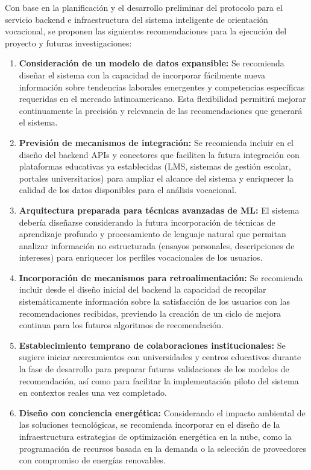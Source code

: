 Con base en la planificación y el desarrollo preliminar del protocolo para el servicio backend e infraestructura del sistema inteligente de orientación vocacional, se proponen las siguientes recomendaciones para la ejecución del proyecto y futuras investigaciones:
\begin{enumerate}
\item \textbf{Consideración de un modelo de datos expansible:} Se recomienda diseñar el sistema con la capacidad de incorporar fácilmente nueva información sobre tendencias laborales emergentes y competencias específicas requeridas en el mercado latinoamericano. Esta flexibilidad permitirá mejorar continuamente la precisión y relevancia de las recomendaciones que generará el sistema.
\item \textbf{Previsión de mecanismos de integración:} Se recomienda incluir en el diseño del backend APIs y conectores que faciliten la futura integración con plataformas educativas ya establecidas (LMS, sistemas de gestión escolar, portales universitarios) para ampliar el alcance del sistema y enriquecer la calidad de los datos disponibles para el análisis vocacional.
\item \textbf{Arquitectura preparada para técnicas avanzadas de ML:} El sistema debería diseñarse considerando la futura incorporación de técnicas de aprendizaje profundo y procesamiento de lenguaje natural que permitan analizar información no estructurada (ensayos personales, descripciones de intereses) para enriquecer los perfiles vocacionales de los usuarios.
\item \textbf{Incorporación de mecanismos para retroalimentación:} Se recomienda incluir desde el diseño inicial del backend la capacidad de recopilar sistemáticamente información sobre la satisfacción de los usuarios con las recomendaciones recibidas, previendo la creación de un ciclo de mejora continua para los futuros algoritmos de recomendación.
\item \textbf{Establecimiento temprano de colaboraciones institucionales:} Se sugiere iniciar acercamientos con universidades y centros educativos durante la fase de desarrollo para preparar futuras validaciones de los modelos de recomendación, así como para facilitar la implementación piloto del sistema en contextos reales una vez completado.
\item \textbf{Diseño con conciencia energética:} Considerando el impacto ambiental de las soluciones tecnológicas, se recomienda incorporar en el diseño de la infraestructura estrategias de optimización energética en la nube, como la programación de recursos basada en la demanda o la selección de proveedores con compromiso de energías renovables.

\end{enumerate}

